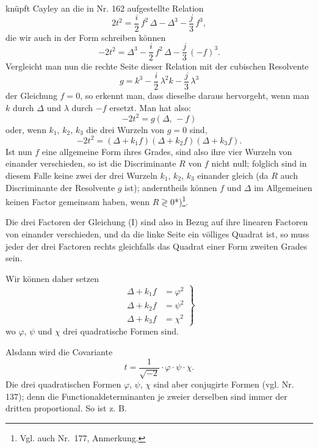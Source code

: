 \documentclass[11pt]{article}
\providecommand{\weberpage}[1]{}
\providecommand{\weq}[2]{\begin{equation}\tag{#1}#2\end{equation}}
\let\Delta\varDelta
\begin{document}
\weberpage{193}
knüpft Cayley an die in Nr. 162 aufgestellte Relation
\[
2t^2 = \frac{i}{2}\, f^2\, \Delta - \Delta^3 - \frac{j}{3}\, f^3,
\]
die wir auch in der Form schreiben können
\[
-2t^2 = \Delta^3 - \frac{i}{2}\, f^2\, \Delta - \frac{j}{3}\, (-f)^3.
\]
Vergleicht man nun die rechte Seite dieser Relation mit der cubischen Resolvente
\[
g = k^3 - \frac{i}{2}\, \lambda^2 k - \frac{j}{3}\, \lambda^3
\]
der Gleichung $f = 0$, so erkennt man, dass dieselbe daraus hervorgeht, wenn man $k$ durch $\Delta$ und $\lambda$ durch $-f$ ersetzt. Man hat also:
\[
-2t^2 = g(\Delta,\, -f)
\]
oder, wenn $k_1$, $k_2$, $k_3$ die drei Wurzeln von $g=0$ sind,
\weq{1}{-2t^2 = (\Delta+k_1f)(\Delta+k_2f)(\Delta+k_3f).}
Ist nun $f$ eine allgemeine Form ihres Grades, sind also ihre vier Wurzeln von einander verschieden, so ist die Discriminante $R$ von $f$ nicht null; folglich sind in diesem Falle keine zwei der drei Wurzeln $k_1$, $k_2$, $k_3$ einander gleich (da $R$ auch Discriminante der Resolvente $g$ ist); anderntheils können $f$ und $\Delta$ im Allgemeinen keinen Factor gemeinsam haben, wenn $R \gtrless 0$*)\footnote{Vgl. auch Nr.~177, Anmerkung.}.

Die drei Factoren der Gleichung (I) sind also in Bezug auf ihre linearen Factoren von einander verschieden, und da die linke Seite ein völliges Quadrat ist, so muss jeder der drei Factoren rechts gleichfalls das Quadrat einer Form zweiten Grades sein.

Wir können daher setzen
\weq{2}{\left.\begin{aligned}
\Delta + k_1 f &= \varphi^2 \\
\Delta + k_2 f &= \psi^2 \\
\Delta + k_3 f &= \chi^2
\end{aligned}\right\}}
wo $\varphi$, $\psi$ und $\chi$ drei quadratische Formen sind.

Alsdann wird die Covariante
\[
t = \frac{1}{\sqrt{-2}} \cdot \varphi \cdot \psi \cdot \chi.
\]
Die drei quadratischen Formen $\varphi$, $\psi$, $\chi$ sind aber conjugirte Formen (vgl. Nr. 137); denn die Functionaldeterminanten je zweier derselben sind immer der dritten proportional. So ist z. B.
\end{document}

